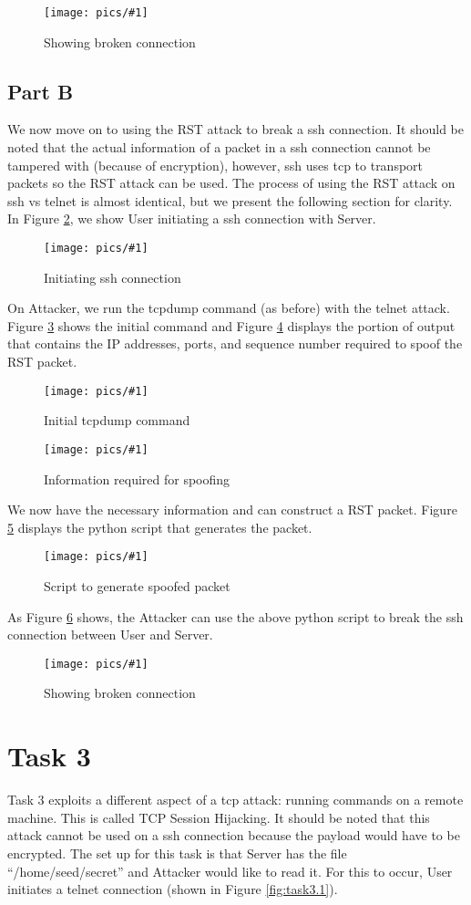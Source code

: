 \documentclass[11pt]{article}
\newcommand{\fig}[2]{ 
\begin{figure}[h]
	\centering
	\caption{#2}
	\texttt{[image: pics/\#1]}
	\label{fig:#1}
\end{figure} 
}
\begin{document}
\fig{task2.A.5}{Showing broken connection}

\newpage
\subsection*{Part B}

We now move on to using the RST attack to break a ssh connection. It should be noted that the actual information of a packet in a ssh connection cannot be tampered with (because of encryption), however, ssh uses tcp to transport packets so the RST attack can be used. The process of using the RST attack on ssh vs telnet is almost identical, but we present the following section for clarity. In Figure \ref{fig:task2.B.1}, we show User initiating a ssh connection with Server.

\fig{task2.B.1}{Initiating ssh connection}

On Attacker, we run the tcpdump command (as before) with the telnet attack. Figure \ref{fig:task2.B.2} shows the initial command and Figure \ref{fig:task2.B.3} displays the portion of output that contains the IP addresses, ports, and sequence number required to spoof the RST packet.

\fig{task2.B.2}{Initial tcpdump command}

\fig{task2.B.3}{Information required for spoofing}

\newpage
We now have the necessary information and can construct a RST packet. Figure \ref{fig:task2.B.4} displays the python script that generates the packet.

\fig{task2.B.4}{Script to generate spoofed packet}

As Figure \ref{fig:task2.B.5} shows, the Attacker can use the above python script to break the ssh connection between User and Server. 

\fig{task2.B.5}{Showing broken connection}

\newpage
\section*{Task 3}

Task 3 exploits a different aspect of a tcp attack: running commands on a remote machine. This is called TCP Session Hijacking. It should be noted that this attack cannot be used on a ssh connection because the payload would have to be encrypted. The set up for this task is that Server has the file ``/home/seed/secret'' and Attacker would like to read it. For this to occur, User initiates a telnet connection (shown in Figure \ref{fig:task3.1}). 
\end{document}
